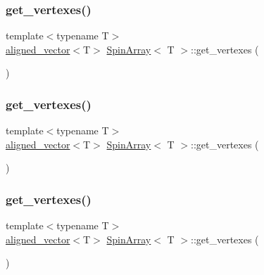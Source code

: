 \mbox{\label{classSpinArray_ac4a17ebe80ae433662d69537adf9a4de}} 
\subsubsection{\texorpdfstring{get\+\_\+vertexes()}{get\_vertexes()}\hspace{0.1cm}{\footnotesize\ttfamily [1/4]}}
{\footnotesize\ttfamily template$<$typename T$>$ \\
\mbox{\hyperlink{type__definitions_8hpp_a087efd587d66b881646ef378f1919c90}{aligned\+\_\+vector}}$<$T$>$ \mbox{\hyperlink{classSpinArray}{Spin\+Array}}$<$ T $>$\+::get\+\_\+vertexes (\begin{DoxyParamCaption}{ }\end{DoxyParamCaption})\hspace{0.3cm}{\ttfamily [inline]}}

\mbox{\label{classSpinArray_ac4a17ebe80ae433662d69537adf9a4de}} 
\subsubsection{\texorpdfstring{get\+\_\+vertexes()}{get\_vertexes()}\hspace{0.1cm}{\footnotesize\ttfamily [2/4]}}
{\footnotesize\ttfamily template$<$typename T$>$ \\
\mbox{\hyperlink{type__definitions_8hpp_a087efd587d66b881646ef378f1919c90}{aligned\+\_\+vector}}$<$T$>$ \mbox{\hyperlink{classSpinArray}{Spin\+Array}}$<$ T $>$\+::get\+\_\+vertexes (\begin{DoxyParamCaption}{ }\end{DoxyParamCaption})\hspace{0.3cm}{\ttfamily [inline]}}

\mbox{\label{classSpinArray_ac4a17ebe80ae433662d69537adf9a4de}} 
\subsubsection{\texorpdfstring{get\+\_\+vertexes()}{get\_vertexes()}\hspace{0.1cm}{\footnotesize\ttfamily [3/4]}}
{\footnotesize\ttfamily template$<$typename T$>$ \\
\mbox{\hyperlink{type__definitions_8hpp_a087efd587d66b881646ef378f1919c90}{aligned\+\_\+vector}}$<$T$>$ \mbox{\hyperlink{classSpinArray}{Spin\+Array}}$<$ T $>$\+::get\+\_\+vertexes (\begin{DoxyParamCaption}{ }\end{DoxyParamCaption})\hspace{0.3cm}{\ttfamily [inline]}}

